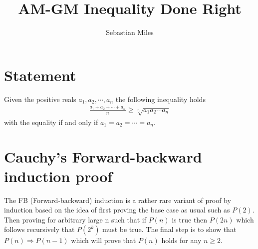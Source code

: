 \documentclass{article}
\title{AM-GM Inequality Done Right}
\author{Sebastian Miles}
\date{}
\begin{document}
	\maketitle
	\section{Statement}
	Given the positive reals $a_1,a_2, \cdots, a_n$ the following inequality holds
	\begin{align*}
		\frac{a_1+a_2+ \cdots + a_n}{n} \geq \sqrt[n]{a_1a_2 \cdots a_n}
	\end{align*}
	with the equality if and only if $a_1=a_2=\cdots=a_n$.
	
	\section{Cauchy's Forward-backward induction proof}
	The FB (Forward-backward) induction is a rather rare variant of proof by induction based on the idea of first proving the base case as usual such as $P(2)$. Then proving for arbitrary large n such that if $P(n)$ is true then $P(2n)$ which follows recursively that $P(2^k)$ must be true. The final step is to show that $P(n) \Rightarrow P(n-1)$ which will prove that $P(n)$ holds for any $n \geq 2$.
	
\end{document}
